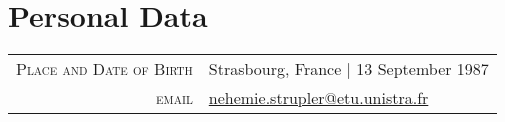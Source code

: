 \documentclass[a4paper,10pt]{article}
\begin{document}
\thispagestyle{empty}
\par{\bigskip\par} %
\vspace{-0.7cm}
\flushright {\small \textcolor{Gray}{Last update: \isodate\today} } %




\vspace{0.5cm}
\section{Personal Data}

\flushleft
\begin{tabular}{rl}
\textsc{Place and Date of Birth} & Strasbourg, France  | 13 September 1987 \\
\textsc{email} & \href{mailto:nehemie.strupler@etu.unistra.fr}{nehemie.strupler@etu.unistra.fr}
\end{tabular}




\vspace{0.3cm}





\vspace{0.cm}




\vspace{0.2cm}

\end{document}
